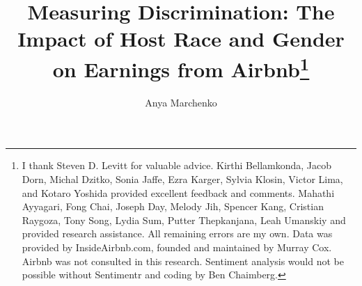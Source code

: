 \documentclass[11pt, oneside]{article}
\begin{document}
\begin{comment}
Options for first sentence of abstract:
\begin{enumerate}
\item The extent of discrimination on Airbnb, especially against hosts, remains poorly researched. 
\item Despite well-publicized efforts by Airbnb to address discrimination on its platform, the discrimination against hosts remains poorly measured by economists. 
\item Even though discrimination against hosts on Airbnb carries serious economic consequences for agents, the issue has remained poorly researched. 
\item Measuring discrimination is challenging because in the absence of an experiment, it requires controlling for an extensive set of covariates. 
\item Little research has been done on the extent of discrimination against hosts on Airbnb because of data restrictions, and difficulty of setting up an experiment. 
\end{enumerate}
\end{comment}


\title{Measuring Discrimination: The Impact of Host Race and Gender on Earnings from Airbnb\footnote
	{I thank Steven D. Levitt for valuable advice. Kirthi Bellamkonda, Jacob Dorn, Michal Dzitko, Sonia Jaffe, Ezra Karger, Sylvia Klosin, Victor Lima, and Kotaro Yoshida provided excellent feedback and comments. Mahathi Ayyagari, Fong Chai, Joseph Day, Melody Jih, Spencer Kang, Cristian Raygoza, Tony Song, Lydia Sum, Putter Thepkanjana, Leah Umanskiy and provided research assistance. All remaining errors are my own. Data was provided by InsideAirbnb.com, founded and maintained by Murray Cox. Airbnb was not consulted in this research. Sentiment analysis would not be possible without Sentimentr and coding by Ben Chaimberg.}}
\author{Anya Marchenko}
\maketitle
\end{document}
